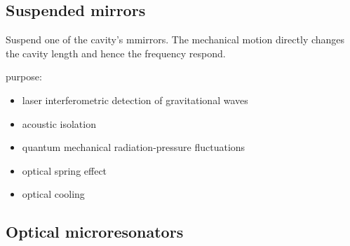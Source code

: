 \documentclass[8pt,a4paper,twocolumn]{article} %
\numberwithin{equation}{section} %
\begin{document}
		\subsection{Suspended mirrors} %
		\label{sub:suspended_mirrors}
			Suspend one of the cavity's mmirrors. The mechanical motion directly changes the cavity length and hence the frequency respond.

			purpose:
			\begin{itemize}
				\item laser interferometric detection of gravitational waves
				\item acoustic isolation
				\item quantum mechanical radiation-pressure fluctuations
				\item optical spring effect
				\item optical cooling
			\end{itemize}

		\subsection{Optical microresonators} %
		\label{sub:optical_microresonators}
		





	
\end{document}
